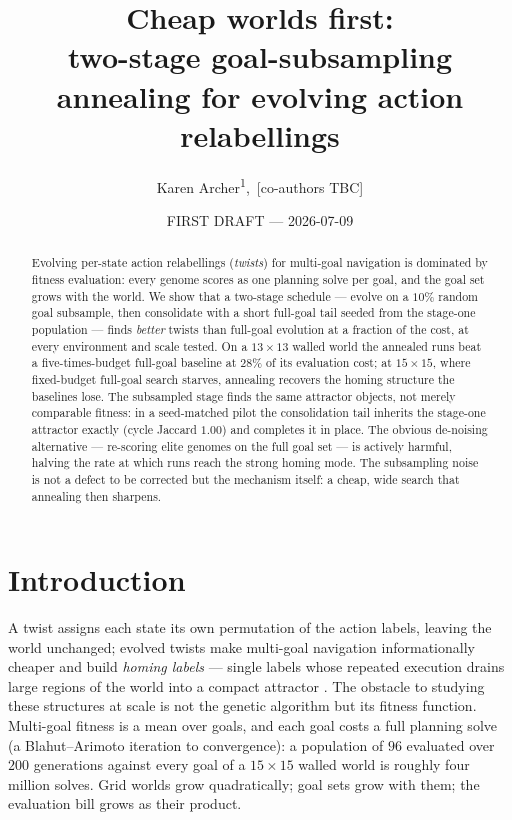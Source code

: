 \documentclass[a4paper, notitlepage, 11pt]{article}
\title{Cheap worlds first:\\ two-stage goal-subsampling annealing for evolving action relabellings}
\author{Karen Archer\textsuperscript{1},\, [co-authors TBC]}
\date{FIRST DRAFT --- 2026-07-09}
\begin{document}
\maketitle

\begin{abstract}
Evolving per-state action relabellings (\emph{twists}) for multi-goal
navigation is dominated by fitness evaluation: every genome scores as one
planning solve per goal, and the goal set grows with the world.  We show
that a two-stage schedule --- evolve on a $10\%$ random goal subsample,
then consolidate with a short full-goal tail seeded from the stage-one
population --- finds \emph{better} twists than full-goal evolution at a
fraction of the cost, at every environment and scale tested.  On a
$13 \times 13$ walled world the annealed runs beat a five-times-budget
full-goal baseline at $28\%$ of its evaluation cost; at $15 \times 15$,
where fixed-budget full-goal search starves, annealing recovers the homing
structure the baselines lose.  The subsampled stage finds the same
attractor objects, not merely comparable fitness: in a seed-matched pilot
the consolidation tail inherits the stage-one attractor exactly (cycle
Jaccard $1.00$) and completes it in place.  The obvious de-noising
alternative --- re-scoring elite genomes on the full goal set --- is
actively harmful, halving the rate at which runs reach the strong homing
mode.  The subsampling noise is not a defect to be corrected but the
mechanism itself: a cheap, wide search that annealing then sharpens.
\end{abstract}

\section{Introduction}
\label{sec:intro}

A twist assigns each state its own permutation of the action labels,
leaving the world unchanged; evolved twists make multi-goal navigation
informationally cheaper and build \emph{homing labels} --- single labels
whose repeated execution drains large regions of the world into a compact
attractor \citep{Archer2026-relabelled-actions}.  The obstacle to studying
these structures at scale is not the genetic algorithm but its fitness
function.  Multi-goal fitness is a mean over goals, and each goal costs a
full planning solve (a Blahut--Arimoto iteration to convergence): a
population of $96$ evaluated over $200$ generations against every goal of
a $15 \times 15$ walled world is roughly four million solves.  Grid worlds
grow quadratically; goal sets grow with them; the evaluation bill grows as
their product.
\end{document}
